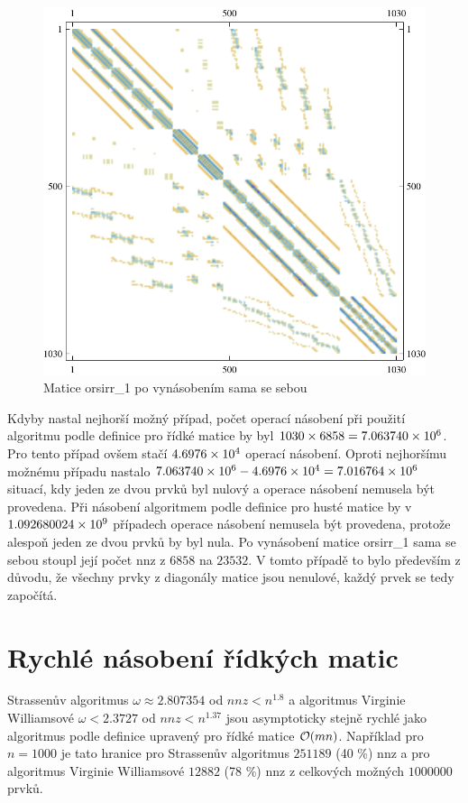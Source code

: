 \begin{figure}[htb]
	\includegraphics[width=1.0\textwidth]{./images/orsirr_1_mul}
	\caption{Matice orsirr\_1 po vynásobením sama se sebou}
	\label{fig:aftOrsirr1}
\end{figure}

Kdyby nastal nejhorší možný případ, počet operací násobení při použití algoritmu podle definice pro řídké matice by byl $1030 \times 6858 = 7.063740\times 10^{6}$. Pro tento případ ovšem stačí $4.6976\times 10^{4}$ operací násobení. Oproti nejhoršímu možnému případu nastalo $7.063740\times 10^{6} - 4.6976\times 10^{4} = 7.016764\times 10^{6}$ situací, kdy jeden ze dvou prvků byl nulový a operace násobení nemusela být provedena. Při násobení algoritmem podle definice pro husté matice by v $1.092680024\times 10^{9}$ případech operace násobení nemusela být provedena, protože alespoň jeden ze dvou prvků by byl nula. Po vynásobení matice orsirr\_1 sama se sebou stoupl její počet nnz z $6858$ na $23532$. V tomto případě to bylo především z důvodu, že všechny prvky z diagonály matice jsou nenulové, každý prvek se tedy započítá.

\label{fast-sparse}
\section{Rychlé násobení řídkých matic}

Strassenův algoritmus $\omega\approx2.807354$ od $nnz<n^{1.8}$ a algoritmus Virginie Williamsové $\omega<2.3727$ od $nnz<n^{1.37}$ jsou asymptoticky stejně rychlé jako algoritmus podle definice upravený pro řídké matice $\mathcal{O}(mn)$. Například pro $n=1000$ je tato hranice pro Strassenův algoritmus $251189$ (40 \%) nnz a pro algoritmus Virginie Williamsové $12882$ (78 \%) nnz z celkových možných $1000000$ prvků.

